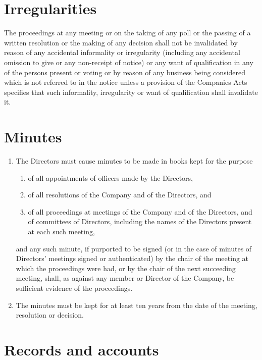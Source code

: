 \documentclass[a4paper,12pt]{article}
\begin{document}
\section{Irregularities}

The proceedings at any meeting or on the taking of any poll or the passing of a written resolution or the making of any decision shall not be invalidated by reason of any accidental informality or irregularity (including any accidental omission to give or any non-receipt of notice) or any want of qualification in any of the persons present or voting or by reason of any business being considered which is not referred to in the notice unless a provision of the Companies Acts specifies that such informality, irregularity or want of qualification shall invalidate it.

\section{Minutes}

\begin{enumerate}
  \item The Directors must cause minutes to be made in books kept for the purpose
  \begin{enumerate}
    \item of all appointments of officers made by the Directors,
    \item of all resolutions of the Company and of the Directors, and
    \item of all proceedings at meetings of the Company and of the Directors, and of committees of Directors, including the names of the Directors present at each such meeting,
  \end{enumerate}
  and any such minute, if purported to be signed (or in the case of minutes of Directors’ meetings signed or authenticated) by the chair of the meeting at which the proceedings were had, or by the chair of the next succeeding meeting, shall, as against any member or Director of the Company, be sufficient evidence of the proceedings.
  \item The minutes must be kept for at least ten years from the date of the meeting, resolution or decision.
\end{enumerate}

\section{Records and accounts}
\end{document}
